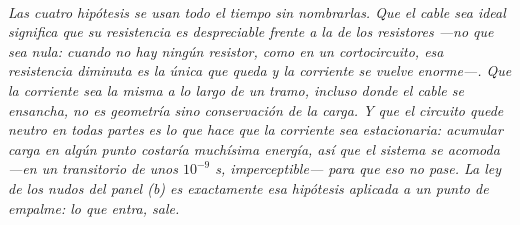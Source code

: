 \begin{center}
\\[0.5em]
{\small\itshape Las cuatro hipótesis se usan todo el tiempo sin nombrarlas.
Que el cable sea ideal significa que su resistencia es despreciable
\emph{frente a la de los resistores} ---no que sea nula: cuando no hay ningún
resistor, como en un cortocircuito, esa resistencia diminuta es la única que
queda y la corriente se vuelve enorme---. Que la corriente sea la misma a lo
largo de un tramo, incluso donde el cable se ensancha, no es geometría sino
conservación de la carga. Y que el circuito quede neutro en todas partes es lo
que hace que la corriente sea estacionaria: acumular carga en algún punto
costaría muchísima energía, así que el sistema se acomoda ---en un transitorio
de unos $10^{-9}$ s, imperceptible--- para que eso no pase. La ley de los nudos
del panel (b) es exactamente esa hipótesis aplicada a un punto de empalme: lo
que entra, sale.}
\end{center}
